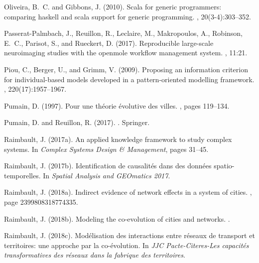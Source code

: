 \documentclass[10pt]{article}
\begin{document}
\begin{thebibliography}{}
Oliveira, B.~C. and Gibbons, J. (2010).
\newblock Scala for generic programmers: comparing haskell and scala support
  for generic programming.
, 20(3-4):303--352.

Passerat-Palmbach, J., Reuillon, R., Leclaire, M., Makropoulos, A., Robinson,
  E.~C., Parisot, S., and Rueckert, D. (2017).
\newblock Reproducible large-scale neuroimaging studies with the openmole
  workflow management system.
, 11:21.

Piou, C., Berger, U., and Grimm, V. (2009).
\newblock Proposing an information criterion for individual-based models
  developed in a pattern-oriented modelling framework.
, 220(17):1957--1967.

Pumain, D. (1997).
\newblock Pour une th{\'e}orie {\'e}volutive des villes.
, pages 119--134.

Pumain, D. and Reuillon, R. (2017).
.
\newblock Springer.

Raimbault, J. (2017a).
\newblock An applied knowledge framework to study complex systems.
\newblock In {\em Complex Systems Design \& Management}, pages 31--45.

Raimbault, J. (2017b).
\newblock Identification de causalités dans des données spatio-temporelles.
\newblock In {\em Spatial Analysis and GEOmatics 2017}.

Raimbault, J. (2018a).
\newblock Indirect evidence of network effects in a system of cities.
,
  page 2399808318774335.

Raimbault, J. (2018b).
\newblock Modeling the co-evolution of cities and networks.
.

Raimbault, J. (2018c).
\newblock Mod{\'e}lisation des interactions entre r{\'e}seaux de transport et
  territoires: une approche par la co-{\'e}volution.
\newblock In {\em JJC Pacte-Citeres-Les capacit{\'e}s transformatives des
  r{\'e}seaux dans la fabrique des territoires}.


\end{thebibliography}
\end{document}
